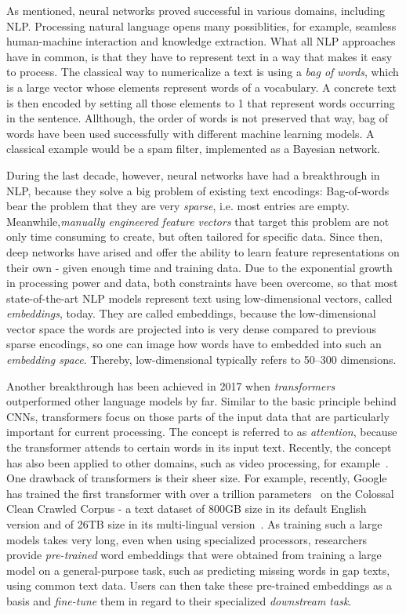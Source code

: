 As mentioned, neural networks proved successful in various domains, including NLP. Processing natural language opens many possiblities, for example, seamless human-machine interaction and knowledge extraction. What all NLP approaches have in common, is that they have to represent text in a way that makes it easy to process. The classical way to numericalize a text is using a \emph{bag of words}, which is a large vector whose elements represent words of a vocabulary. A concrete text is then encoded by setting all those elements to 1 that represent words occurring in the sentence. Allthough, the order of words is not preserved that way, bag of words have been used successfully with different machine learning models. A classical example would be a spam filter, implemented as a Bayesian network.

During the last decade, however, neural networks have had a breakthrough in NLP, because they solve a big problem of existing text encodings: Bag-of-words bear the problem that they are very \emph{sparse}, i.e. most entries are empty. Meanwhile,\emph{manually engineered feature vectors} that target this problem are not only time consuming to create, but often tailored for specific data. Since then, deep networks have arised and offer the ability to learn feature representations on their own - given enough time and training data. Due to the exponential growth in processing power and data, both constraints have been overcome, so that most state-of-the-art NLP models represent text using low-dimensional vectors, called \emph{embeddings}, today. They are called embeddings, because the low-dimensional vector space the words are projected into is very dense compared to previous sparse encodings, so one can image how words have to embedded into such an \emph{embedding space}. Thereby, low-dimensional typically refers to 50--300 dimensions.

Another breakthrough has been achieved in 2017 when \emph{transformers} outperformed other language models by far. Similar to the basic principle behind CNNs, transformers focus on those parts of the input data that are particularly important for current processing. The concept is referred to as \emph{attention}, because the transformer attends to certain words in its input text. Recently, the concept has also been applied to other domains, such as video processing, for example~\cite{Bertasius2021IsSA}. One drawback of transformers is their sheer size. For example, recently, Google has trained the first transformer with over a trillion parameters~\cite{Fedus2021SwitchTS} on the Colossal Clean Crawled Corpus - a text dataset of 800GB size in its default English version and of 26TB size in its multi-lingual version~\cite{C4}. As training such a large models takes very long, even when using specialized processors, researchers provide \emph{pre-trained} word embeddings that were obtained from training a large model on a general-purpose task, such as predicting missing words in gap texts, using common text data. Users can then take these pre-trained embeddings as a basis and \emph{fine-tune} them in regard to their specialized \emph{downstream task}.
